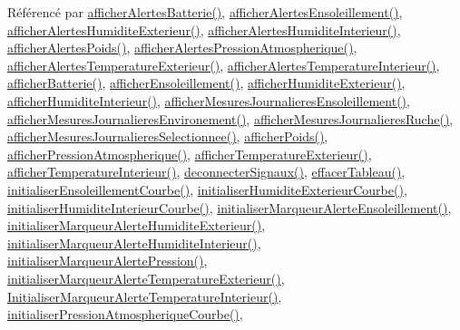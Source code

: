 Référencé par \hyperlink{class_ruche_ihm_a5181062e21dc73908b660d97e9621fb6}{afficher\+Alertes\+Batterie()}, \hyperlink{class_ruche_ihm_aea5efc506f9825db2a4eb39a40d7eb18}{afficher\+Alertes\+Ensoleillement()}, \hyperlink{class_ruche_ihm_a76b73e39e55443fc7b9bb773eac3321f}{afficher\+Alertes\+Humidite\+Exterieur()}, \hyperlink{class_ruche_ihm_abfe91b271dde97048bb218b04c9e167b}{afficher\+Alertes\+Humidite\+Interieur()}, \hyperlink{class_ruche_ihm_a641d05346e527c3386ed9df6a7e6fafc}{afficher\+Alertes\+Poids()}, \hyperlink{class_ruche_ihm_abea08b19d4f52f6767a8618bbc25d956}{afficher\+Alertes\+Pression\+Atmospherique()}, \hyperlink{class_ruche_ihm_ada4be5a54f7fa57de6190d44e3cfcb82}{afficher\+Alertes\+Temperature\+Exterieur()}, \hyperlink{class_ruche_ihm_af4848134f2bc17d9772f2408a068e9d8}{afficher\+Alertes\+Temperature\+Interieur()}, \hyperlink{class_ruche_ihm_a3934082a49b22f4c6096d96887a11591}{afficher\+Batterie()}, \hyperlink{class_ruche_ihm_a8ee0041a209452e8e77f4a50adabff2b}{afficher\+Ensoleillement()}, \hyperlink{class_ruche_ihm_a6381018a7dc88cb966d7bbc49515495e}{afficher\+Humidite\+Exterieur()}, \hyperlink{class_ruche_ihm_a4ab4b1ba1618a9aaf5bdb7f51df987aa}{afficher\+Humidite\+Interieur()}, \hyperlink{class_ruche_ihm_abc250d15e6782c522b3d6676e0ee032d}{afficher\+Mesures\+Journalieres\+Ensoleillement()}, \hyperlink{class_ruche_ihm_a5ee5942435915ca134765f42ff4b9061}{afficher\+Mesures\+Journalieres\+Environement()}, \hyperlink{class_ruche_ihm_a94bd98327a73a15aad1306fc31f53ce8}{afficher\+Mesures\+Journalieres\+Ruche()}, \hyperlink{class_ruche_ihm_a7f66af552d9e7ba0d00437ff3b330706}{afficher\+Mesures\+Journalieres\+Selectionnee()}, \hyperlink{class_ruche_ihm_a840ab51f951632e630f92e6c0b5ecc4d}{afficher\+Poids()}, \hyperlink{class_ruche_ihm_ab38e4be7a1f39c862d7d8ab2ed3de98e}{afficher\+Pression\+Atmospherique()}, \hyperlink{class_ruche_ihm_a63e3a82b98678d00d57748e80fe5258b}{afficher\+Temperature\+Exterieur()}, \hyperlink{class_ruche_ihm_a4b8483705f88b46e253ef73068cd8f2e}{afficher\+Temperature\+Interieur()}, \hyperlink{class_ruche_ihm_a348a76106f3072dd31a382c6025b8113}{deconnecter\+Signaux()}, \hyperlink{class_ruche_ihm_a386868ba4e6e37b9d877fe3ab330e605}{effacer\+Tableau()}, \hyperlink{class_ruche_ihm_a18936cec4b04cee55b582847a5f9c0d7}{initialiser\+Ensoleillement\+Courbe()}, \hyperlink{class_ruche_ihm_ab4bca9c5285c1e9added34ba374eaf84}{initialiser\+Humidite\+Exterieur\+Courbe()}, \hyperlink{class_ruche_ihm_a0ab45ef3e5c512ff1bb4fcfaaa8872bd}{initialiser\+Humidite\+Interieur\+Courbe()}, \hyperlink{class_ruche_ihm_a6d52dd904573d1bfc9551421ab53e8cc}{initialiser\+Marqueur\+Alerte\+Ensoleillement()}, \hyperlink{class_ruche_ihm_ae572f3f2b76e8c9b14a699d3e29422ee}{initialiser\+Marqueur\+Alerte\+Humidite\+Exterieur()}, \hyperlink{class_ruche_ihm_a42785d6da8aca09d8becb6d500de8d9f}{initialiser\+Marqueur\+Alerte\+Humidite\+Interieur()}, \hyperlink{class_ruche_ihm_a87e4e8d783ea0f15d6304ed604c7ddaa}{initialiser\+Marqueur\+Alerte\+Pression()}, \hyperlink{class_ruche_ihm_a410bcf0b7ac3ea7134af65d479802c48}{initialiser\+Marqueur\+Alerte\+Temperature\+Exterieur()}, \hyperlink{class_ruche_ihm_a0f44cb030202047fa9a364dfcbf9a13f}{Initialiser\+Marqueur\+Alerte\+Temperature\+Interieur()}, \hyperlink{class_ruche_ihm_ab070a28e49cab512d62ca449473706e5}{initialiser\+Pression\+Atmospherique\+Courbe()}, 